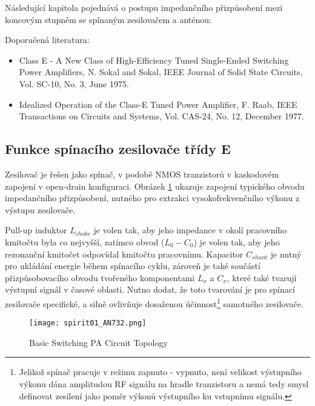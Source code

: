     Následující kapitola pojednává o postupu impedančního přizpůsobení mezi koncovým stupněm se 
    spínaným zesilovačem a anténou: 

    Doporučená literatura:
    \begin{itemize}[noitemsep]
      \item Class E - A New Class of High-Efficiency Tuned Single-Ended Switching Power Amplifiers, 
            N. Sokal and Sokal, IEEE Journal of Solid State Circuits, Vol. SC-10, No. 3, June 1975.
      \item Idealized Operation of the Class-E Tuned Power Amplifier, F. Raab, IEEE Transactions on 
            Circuits and Systems, Vol. CAS-24, No. 12, December 1977.
    \end{itemize}
  
    \subsection{Funkce spínacího zesilovače třídy E}       
      Zesilovač je řešen jako spínač, v podobě NMOS tranzistorů v kaskodovém zapojení v open-drain 
      konfiguraci. Obrázek \ref{EXP001:fig_spirit01} ukazuje zapojení typického obvodu impedančního 
      přizpůsobení, nutného pro extrakci vysokofrekvenčního výkonu z výstupu zesilovače.

      Pull-up induktor \(L_{choke}\) je volen tak, aby jeho impedance v okolí pracovního kmitočtu 
      byla co nejvyšší, zatímco obvod (\(L_0 - C_0\)) je volen tak, aby jeho rezonanční 
      kmitočet odpovídal kmitočtu pracovnímu. Kapacitor \(C_{shunt}\) je nutný pro ukládání energie 
      během spínacího cyklu, zároveň je také součástí přizpůsobovacího obvodu tvořeného 
      komponentami \(L_x\) a \(C_x\), které také tvarují výstupní signál v časové  oblasti. Nutno 
      dodat, že toto tvarování je pro spínací zesilovače specifické, a silně ovlivňuje 
      dosaženou účinnost\footnote{Jelikož spínač pracuje v režimu zapnuto - vypnuto, není velikost 
      výstupního výkonu dána amplitudou RF signálu na hradle tranzistoru a nemá tedy smysl definovat 
      zesílení jako poměr výkonů výstupního ku vstupnímu signálu.} samotného zesilovače. 

      \begin{figure}[ht!]  %
        \centering
        \texttt{[image: spirit01\_AN732.png]}
        \caption{Basic Switching PA Circuit Topology \cite[s.~9]{AN648SiliconLabs}}
        \label{EXP001:fig_spirit01}
      \end{figure}
      
